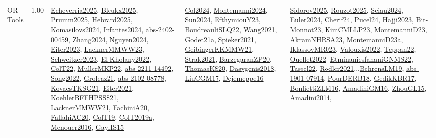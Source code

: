 {\begin{longtable}{p{3cm}r>{\raggedright\arraybackslash}p{6cm}>{\raggedright\arraybackslash}p{6cm}>{\raggedright\arraybackslash}p{8cm}}
\index{OR-Tools}\index{CPSystems!OR-Tools}OR-Tools &  1.00 & \hyperref[detail:Echeverria2025]{Echeverria2025}, \hyperref[detail:Bleukx2025]{Bleukx2025}, \hyperref[detail:Prumm2025]{Prumm2025}, \hyperref[detail:Hebrard2025]{Hebrard2025}, \hyperref[detail:Komasilovs2024]{Komasilovs2024}, \hyperref[detail:Infantes2024]{Infantes2024}, \hyperref[detail:abs-2402-00459]{abs-2402-00459}, \hyperref[detail:Zhang2024]{Zhang2024}, \hyperref[detail:Nguyen2024]{Nguyen2024}, \hyperref[detail:Eiter2023]{Eiter2023}, \hyperref[detail:LacknerMMWW23]{LacknerMMWW23}, \hyperref[detail:Schweitzer2023]{Schweitzer2023}, \hyperref[detail:El-Kholany2022]{El-Kholany2022}, \hyperref[detail:ColT22]{ColT22}, \hyperref[detail:MullerMKP22]{MullerMKP22}, \hyperref[detail:abs-2211-14492]{abs-2211-14492}, \hyperref[detail:Song2022]{Song2022}, \hyperref[detail:Groleaz21]{Groleaz21}, \hyperref[detail:abs-2102-08778]{abs-2102-08778}, \hyperref[detail:KovacsTKSG21]{KovacsTKSG21}, \hyperref[detail:Eiter2021]{Eiter2021}, \hyperref[detail:KoehlerBFFHPSSS21]{KoehlerBFFHPSSS21}, \hyperref[detail:LacknerMMWW21]{LacknerMMWW21}, \hyperref[detail:FachiniA20]{FachiniA20}, \hyperref[detail:FallahiAC20]{FallahiAC20}, \hyperref[detail:ColT19]{ColT19}, \hyperref[detail:ColT2019a]{ColT2019a}, \hyperref[detail:Menouer2016]{Menouer2016}, \hyperref[detail:GayHS15]{GayHS15} & \hyperref[detail:Col2024]{Col2024}, \hyperref[detail:Montemanni2024]{Montemanni2024}, \hyperref[detail:Sun2024]{Sun2024}, \hyperref[detail:EfthymiouY23]{EfthymiouY23}, \hyperref[detail:BoudreaultSLQ22]{BoudreaultSLQ22}, \hyperref[detail:Wang2021]{Wang2021}, \hyperref[detail:Godet21a]{Godet21a}, \hyperref[detail:Spieker2021]{Spieker2021}, \hyperref[detail:GeibingerKKMMW21]{GeibingerKKMMW21}, \hyperref[detail:Strak2021]{Strak2021}, \hyperref[detail:BarzegaranZP20]{BarzegaranZP20}, \hyperref[detail:ThomasKS20]{ThomasKS20}, \hyperref[detail:Dasygenis2018]{Dasygenis2018}, \hyperref[detail:LiuCGM17]{LiuCGM17}, \hyperref[detail:Dejemeppe16]{Dejemeppe16} & \hyperref[detail:Sidorov2025]{Sidorov2025}, \hyperref[detail:Rouzot2025]{Rouzot2025}, \hyperref[detail:Sciau2024]{Sciau2024}, \hyperref[detail:Euler2024]{Euler2024}, \hyperref[detail:Cherif24]{Cherif24}, \hyperref[detail:Pucel24]{Pucel24}, \hyperref[detail:Hajji2023]{Hajji2023}, \hyperref[detail:Bit-Monnot23]{Bit-Monnot23}, \hyperref[detail:KimCMLLP23]{KimCMLLP23}, \hyperref[detail:MontemanniD23]{MontemanniD23}, \hyperref[detail:AkramNHRSA23]{AkramNHRSA23}, \hyperref[detail:MontemanniD23a]{MontemanniD23a}, \hyperref[detail:IklassovMR023]{IklassovMR023}, \hyperref[detail:Valouxis2022]{Valouxis2022}, \hyperref[detail:Teppan22]{Teppan22}, \hyperref[detail:Ouellet2022]{Ouellet2022}, \hyperref[detail:EtminaniesfahaniGNMS22]{EtminaniesfahaniGNMS22}, \hyperref[detail:Tassel22]{Tassel22}, \hyperref[detail:Rodler2021]{Rodler2021}...\hyperref[detail:BehrensLM19]{BehrensLM19}, \hyperref[detail:abs-1901-07914]{abs-1901-07914}, \hyperref[detail:PourDERB18]{PourDERB18}, \hyperref[detail:GedikKBR17]{GedikKBR17}, \hyperref[detail:BonfiettiZLM16]{BonfiettiZLM16}, \hyperref[detail:AmadiniGM16]{AmadiniGM16}, \hyperref[detail:ZhouGL15]{ZhouGL15}, \hyperref[detail:Amadini2014]{Amadini2014}, 
\end{longtable}}
